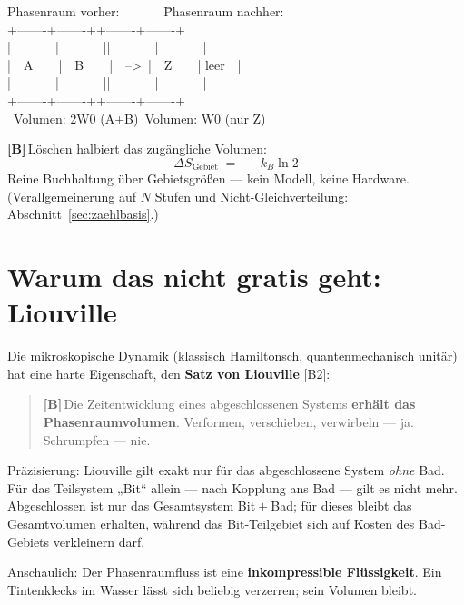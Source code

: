 \documentclass[11pt,a4paper]{article}
\newcommand{\LB}{\textcolor{layB}{\textbf{\footnotesize\textsf{[B]}}}\,}
\begin{document}
\begin{center}
\begin{minipage}{0.75\textwidth}
\ttfamily\small
\begin{tabbing}
Phasenraum vorher:\ \ \ \ \ \ \ \=Phasenraum nachher:\\[0.3em]
+-------+-------+\>+-------+-------+\\
|\ \ \ \ \ \ \ |\ \ \ \ \ \ \ |\>|\ \ \ \ \ \ \ |\ \ \ \ \ \ \ |\\
|\ \ A\ \ \ \ |\ \ B\ \ \ \ |\ \ -->\ \>|\ \ Z\ \ \ \ | leer\ \ |\\
|\ \ \ \ \ \ \ |\ \ \ \ \ \ \ |\>|\ \ \ \ \ \ \ |\ \ \ \ \ \ \ |\\
+-------+-------+\>+-------+-------+\\
\ Volumen: 2W0 (A+B)\>\ Volumen: W0 (nur Z)
\end{tabbing}
\end{minipage}
\end{center}

\LB Löschen halbiert das zugängliche Volumen:
\[
  \Delta S_{\text{Gebiet}} \;=\; -\,k_B \ln 2
\]
Reine Buchhaltung über Gebietsgrößen --- kein Modell, keine Hardware.
(Verallgemeinerung auf $N$ Stufen und Nicht-Gleichverteilung:
Abschnitt~\ref{sec:zaehlbasis}.)

\section{Warum das nicht gratis geht: Liouville}
\label{sec:liouville}

Die mikroskopische Dynamik (klassisch Hamiltonsch, quantenmechanisch unitär) hat
eine harte Eigenschaft, den \textbf{Satz von Liouville} [B2]:

\begin{quote}
\LB Die Zeitentwicklung eines abgeschlossenen Systems \textbf{erhält das
Phasenraumvolumen}. Verformen, verschieben, verwirbeln --- ja. Schrumpfen --- nie.
\end{quote}

Präzisierung: Liouville gilt exakt nur für das abgeschlossene System \emph{ohne}
Bad. Für das Teilsystem „Bit“ allein --- nach Kopplung ans Bad --- gilt es nicht
mehr. Abgeschlossen ist nur das Gesamtsystem Bit${}+{}$Bad; für dieses bleibt das
Gesamtvolumen erhalten, während das Bit-Teilgebiet sich auf Kosten des Bad-Gebiets
verkleinern darf.

Anschaulich: Der Phasenraumfluss ist eine \textbf{inkompressible Flüssigkeit}. Ein
Tintenklecks im Wasser lässt sich beliebig verzerren; sein Volumen bleibt.
\end{document}
